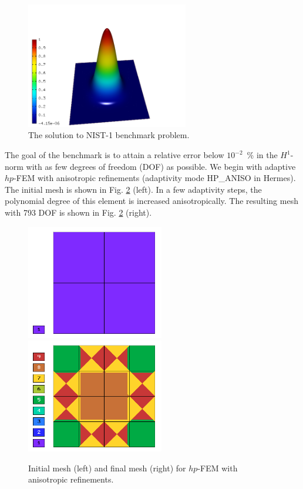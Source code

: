 \documentclass[12pt]{elsarticle}
\begin{document}
\begin{figure}[!ht]
\centering
\includegraphics[height=5.5cm]{nist/nist-1/solution.png}
\caption{The solution to NIST-1 benchmark problem.}
\label{fig:sln-nist01}
\end{figure}
\noindent
The goal of the benchmark is to attain a relative error below
$10^{-2}$~\% in the $H^1$-norm with as few degrees of freedom (DOF)
as possible.
We begin with adaptive $hp$-FEM with anisotropic refinements (adaptivity mode
HP\_ANISO in {\sc Hermes}). The initial mesh is shown in Fig. \ref{fig:nist-1-hp-aniso} (left).
In a few adaptivity steps, the polynomial degree of this element is increased
anisotropically.
The resulting mesh with 793 DOF is shown in Fig. \ref{fig:nist-1-hp-aniso} (right).

\begin{figure}[!ht]
\centering
\includegraphics[height=5cm]{nist/nist-1/mesh_hp_aniso_init.png}\ \
\includegraphics[height=5cm]{nist/nist-1/mesh_hp_aniso.png}
\vspace{-2mm}
\caption{Initial mesh (left) and final mesh (right) for $hp$-FEM with anisotropic refinements.}
\label{fig:nist-1-hp-aniso}
\end{figure}
\end{document}
